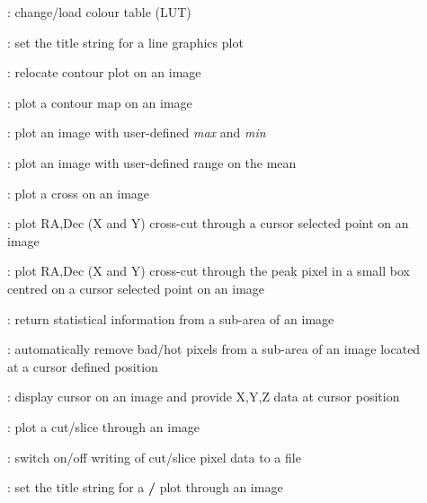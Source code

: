 \begin{description}
\item []: change/load colour table (LUT)

\item []: set the title string for a
line graphics plot

\item []: relocate contour plot on an image

\item []: plot a contour map on an image

\item []: plot an image with user-defined {\it
max} and {\it min}

\item []: plot an image with user-defined
range on the mean

\item []: plot a cross on an image

\item []: plot RA,Dec (X and Y) cross-cut
through a cursor selected point on an image

\item []: plot RA,Dec (X and Y)
cross-cut through the peak pixel in a small box centred on a cursor
selected point on an image

\item []: return statistical information from a
sub-area of an image

\item []: automatically remove bad/hot pixels
from a sub-area of an image located at a cursor defined position

\item []: display cursor on an image and
provide X,Y,Z data at cursor position

\item []: plot a cut/slice through an image

\item []: switch on/off writing of cut/slice
pixel data to a file

\item []: set the title string for a
{\bf {}/} plot through an image


\end{description}
